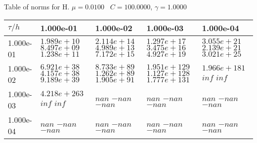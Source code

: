 \begin{center}
Table of norms for H. $\mu = 0.0100$ \, $C = 100.0000$, $\gamma = 1.0000$
  
\begin{tabular}{|p{1in}|p{1in}|p{1in}|p{1in}|p{1in}|} \hline
$\tau / h$ &1.000e-01 &1.000e-02 &1.000e-03 &1.000e-04 \\ \hline 
1.000e-01 & $1.989e+10$  $8.497e+09$  $1.238e+11$  & $2.114e+14$  $4.989e+13$  $7.172e+15$  & $1.297e+17$  $3.475e+16$  $4.927e+19$  & $3.055e+21$  $2.139e+21$  $3.021e+25$  \\ \hline 
1.000e-02 & $6.921e+38$  $4.157e+38$  $9.189e+39$  & $8.733e+89$  $1.262e+89$  $1.905e+91$  & $1.951e+129$  $1.127e+128$  $1.777e+131$  & $1.966e+181$  $inf$  $inf$  \\ \hline 
1.000e-03 & $4.218e+263$  $inf$  $inf$  & $nan$  $-nan$  $-nan$  & $nan$  $-nan$  $-nan$  & $nan$  $-nan$  $-nan$  \\ \hline 
1.000e-04 & $nan$  $-nan$  $-nan$  & $nan$  $-nan$  $-nan$  & $nan$  $-nan$  $-nan$  & $nan$  $-nan$  $-nan$  \\ \hline 

\end{tabular}\\[20pt]
\end{center}
